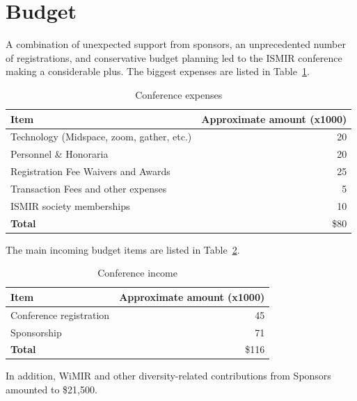 \documentclass[%
10pt,								%
titlepage,						%
]
{scrartcl}
\begin{document}
\section{Budget}
    A combination of unexpected support from sponsors, an unprecedented number of registrations, and conservative budget planning led to the ISMIR conference making a considerable plus. The biggest expenses are listed in Table~\ref{tab:expenses}.
                \begin{table}
                    \centering
                    \begin{tabular}{l|r}
                        \textbf{Item} & \textbf{Approximate amount (x1000)}\\ \hline
                        
                        Technology (Midspace, zoom, gather, etc.) & 20 \\
                        Personnel \& Honoraria & 20 \\
                        Registration Fee Waivers and Awards & 25 \\
                        Transaction Fees and other expenses & 5 \\
                        ISMIR society memberships & 10 \\
                        \hline
                        \textbf{Total} & \$80
                    
                    \end{tabular}
                    \caption{Conference expenses}
                    \label{tab:expenses}
                \end{table}
                The main incoming budget items are listed in Table~\ref{tab:income}.
                \begin{table}
                    \centering
                    \begin{tabular}{l|r}
                        \textbf{Item} & \textbf{Approximate amount (x1000)}\\ \hline
                        
                        Conference registration & 45 \\
                        Sponsorship & 71 \\
                        \hline
                        \textbf{Total} & \$116
                    
                    \end{tabular}
                    \caption{Conference income}
                    \label{tab:income}
                \end{table}
                In addition, WiMIR and other diversity-related contributions from Sponsors amounted to \$21,500.
                
\end{document}
